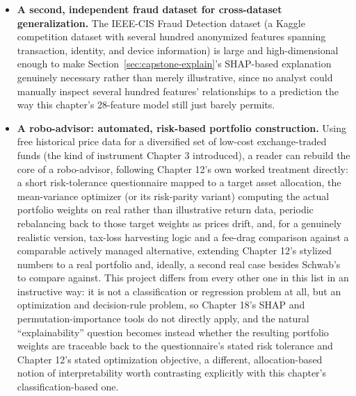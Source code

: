 \documentclass[../ai_in_finance]{subfiles}
\begin{document}
\begin{itemize}
    \item \textbf{A second, independent fraud dataset for cross-dataset generalization.} The IEEE-CIS Fraud Detection dataset (a Kaggle competition dataset with several hundred anonymized features spanning transaction, identity, and device information) is large and high-dimensional enough to make Section~\ref{sec:capstone-explain}'s SHAP-based explanation genuinely necessary rather than merely illustrative, since no analyst could manually inspect several hundred features' relationships to a prediction the way this chapter's 28-feature model still just barely permits.
    \item \textbf{A robo-advisor: automated, risk-based portfolio construction.} Using free historical price data for a diversified set of low-cost exchange-traded funds (the kind of instrument Chapter 3 introduced), a reader can rebuild the core of a robo-advisor, following Chapter 12's own worked treatment directly: a short risk-tolerance questionnaire mapped to a target asset allocation, the mean-variance optimizer (or its risk-parity variant) computing the actual portfolio weights on real rather than illustrative return data, periodic rebalancing back to those target weights as prices drift, and, for a genuinely realistic version, tax-loss harvesting logic and a fee-drag comparison against a comparable actively managed alternative, extending Chapter 12's stylized numbers to a real portfolio and, ideally, a second real case besides Schwab's to compare against. This project differs from every other one in this list in an instructive way: it is not a classification or regression problem at all, but an optimization and decision-rule problem, so Chapter 18's SHAP and permutation-importance tools do not directly apply, and the natural ``explainability'' question becomes instead whether the resulting portfolio weights are traceable back to the questionnaire's stated risk tolerance and Chapter 12's stated optimization objective, a different, allocation-based notion of interpretability worth contrasting explicitly with this chapter's classification-based one.

\end{itemize}
\end{document}
